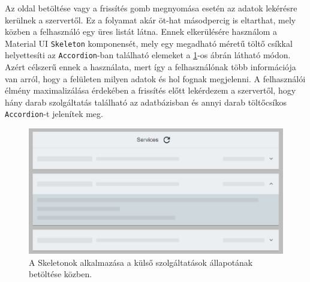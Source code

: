 Az oldal betöltése vagy a frissítés gomb megnyomása esetén az adatok lekérésre kerülnek a szervertől.
Ez a folyamat akár öt-hat másodpercig is eltarthat, mely közben a felhasználó egy üres listát látna.
Ennek elkerülésére használom a Material UI \verb+Skeleton+ komponensét, 
mely egy megadható méretű töltő csíkkal helyettesíti az \verb+Accordion+-ban található elemeket a \ref{fig:dashboard-services-loading}-os ábrán látható módon.
Azért célszerű ennek a használata, mert így a felhasználónak több információja van arról, hogy a felületen milyen adatok és hol fognak megjelenni.
A felhasználói élmény maximalizálása érdekében a frissítés előtt lekérdezem a szervertől, hogy hány darab szolgáltatás található az adatbázisban 
és annyi darab töltőcsíkos \verb+Accordion+-t jelenítek meg. 

\begin{figure}[!ht]
    \centering
    \includegraphics[width=150mm, keepaspectratio]{figures/dashboard-services-loading.png}
    \caption{A Skeletonok alkalmazása a külső szolgáltatások állapotának betöltése közben.}
    \label{fig:dashboard-services-loading}
\end{figure}

